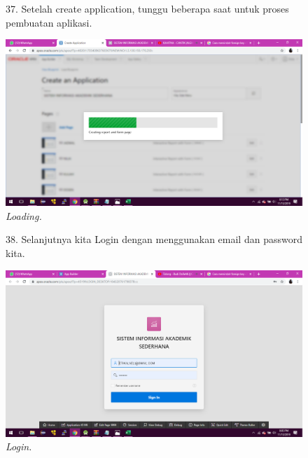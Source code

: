 \begin{enumerate}
\begin{figure}
\item[37.]Setelah create application, tunggu beberapa saat untuk proses pembuatan aplikasi.
    \begin{center}
    \includegraphics[scale=0.3]{figures/65.png}
    \caption{\textit{Loading.}}
    \end{center}
    \label{gambar}
    \end{figure}   

\begin{figure}
\item[38.]Selanjutnya kita Login dengan menggunakan email dan password kita.
    \begin{center}
    \includegraphics[scale=0.3]{figures/59.png}
    \caption{\textit{Login.}}
    \end{center}
    \label{gambar}
    \end{figure}   


\end{enumerate}
